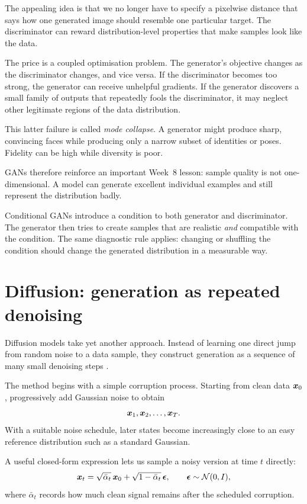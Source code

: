The appealing idea is that we no longer have to specify a pixelwise distance that says how one generated image should resemble one particular target. The discriminator can reward distribution-level properties that make samples look like the data.

The price is a coupled optimisation problem. The generator's objective changes as the discriminator changes, and vice versa. If the discriminator becomes too strong, the generator can receive unhelpful gradients. If the generator discovers a small family of outputs that repeatedly fools the discriminator, it may neglect other legitimate regions of the data distribution.

This latter failure is called \emph{mode collapse}. A generator might produce sharp, convincing faces while producing only a narrow subset of identities or poses. Fidelity can be high while diversity is poor.

GANs therefore reinforce an important Week~8 lesson: sample quality is not one-dimensional. A model can generate excellent individual examples and still represent the distribution badly.

Conditional GANs introduce a condition to both generator and discriminator. The generator then tries to create samples that are realistic \emph{and} compatible with the condition. The same diagnostic rule applies: changing or shuffling the condition should change the generated distribution in a measurable way.

\section{Diffusion: generation as repeated denoising}

Diffusion models take yet another approach. Instead of learning one direct jump from random noise to a data sample, they construct generation as a sequence of many small denoising steps \parencite{ho2020}.

The method begins with a simple corruption process. Starting from clean data \(\bm{x}_0\), progressively add Gaussian noise to obtain
\[
  \bm{x}_1,\bm{x}_2,\ldots,\bm{x}_T.
\]
With a suitable noise schedule, later states become increasingly close to an easy reference distribution such as a standard Gaussian.

A useful closed-form expression lets us sample a noisy version at time \(t\) directly:
\begin{equation}
  \bm{x}_t
  = \sqrt{\bar\alpha_t}\,\bm{x}_0
    + \sqrt{1-\bar\alpha_t}\,\bm{\epsilon},
  \qquad
  \bm{\epsilon}\sim\mathcal{N}(0,I),
  \label{eq:week8-forward-diffusion}
\end{equation}
where \(\bar\alpha_t\) records how much clean signal remains after the scheduled corruption.

